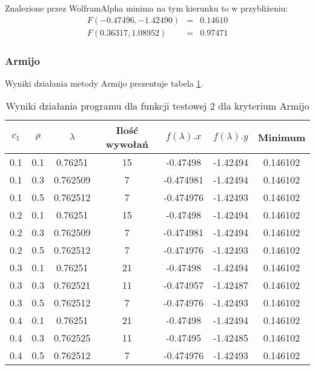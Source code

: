 \documentclass{classrep}
\begin{document}

Znalezione przez WolframAlpha minima na tym kierunku to w przybliżeniu:
\begin{eqnarray}
 F(-0.47496, -1.42490) & = & 0.14610 \\ 
 F( 0.36317,  1.08952) & = & 0.97471
\end{eqnarray}


\subsubsection{Armijo}

Wyniki działania metody Armijo prezentuje tabela \ref{armijo2}.

\begin{table}
  \centering
  \caption{Wyniki działania programu dla funkcji testowej 2 dla kryterium Armijo}
  \label{armijo2}
  \begin{tabular}{|c|c|c|c|c|c|c|}
    \hline
    $c_1$ & $\rho$ & $\lambda$ & Ilość wywołań & $f(\lambda).x$ & $f(\lambda).y$ & Minimum \\
    \hline
    0.1 & 0.1 & 0.76251 & 15 & -0.47498 & -1.42494 & 0.146102 \\
    0.1 & 0.3 & 0.762509 & 7 & -0.474981 & -1.42494 & 0.146102 \\
    0.1 & 0.5 & 0.762512 & 7 & -0.474976 & -1.42493 & 0.146102 \\
    0.2 & 0.1 & 0.76251 & 15 & -0.47498 & -1.42494 & 0.146102 \\
    0.2 & 0.3 & 0.762509 & 7 & -0.474981 & -1.42494 & 0.146102 \\
    0.2 & 0.5 & 0.762512 & 7 & -0.474976 & -1.42493 & 0.146102 \\
    0.3 & 0.1 & 0.76251 & 21 & -0.47498 & -1.42494 & 0.146102 \\
    0.3 & 0.3 & 0.762521 & 11 & -0.474957 & -1.42487 & 0.146102 \\
    0.3 & 0.5 & 0.762512 & 7 & -0.474976 & -1.42493 & 0.146102 \\
    0.4 & 0.1 & 0.76251 & 21 & -0.47498 & -1.42494 & 0.146102 \\
    0.4 & 0.3 & 0.762525 & 11 & -0.47495 & -1.42485 & 0.146102 \\
    0.4 & 0.5 & 0.762512 & 7 & -0.474976 & -1.42493 & 0.146102 \\
    \hline
  \end{tabular}
\end{table}
\end{document}
